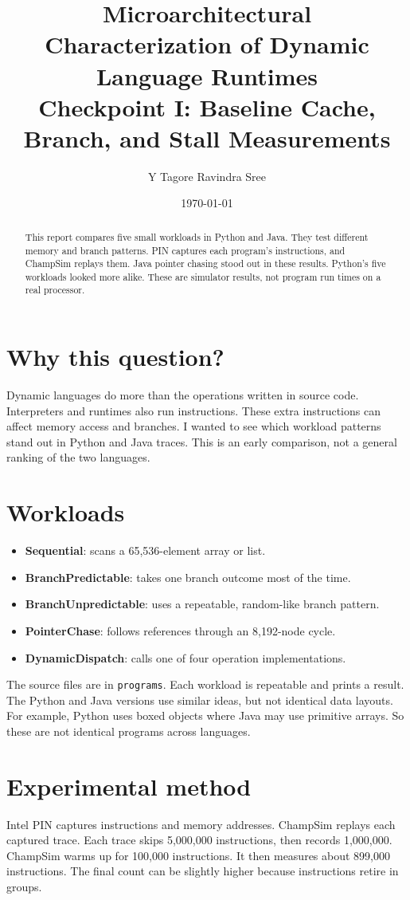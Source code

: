 \documentclass[11pt]{article}
\title{Microarchitectural Characterization of Dynamic Language Runtimes\\
\large Checkpoint I: Baseline Cache, Branch, and Stall Measurements}
\author{Y Tagore Ravindra Sree}
\date{\today}
\begin{document}
\maketitle

\begin{abstract}
This report compares five small workloads in Python and Java. They test
different memory and branch patterns. PIN captures each program's instructions,
and ChampSim replays them. Java pointer chasing stood out in these results.
Python's five workloads looked more alike. These are simulator results, not
program run times on a real processor.
\end{abstract}

\section{Why this question?}
Dynamic languages do more than the operations written in source code.
Interpreters and runtimes also run instructions. These extra instructions can
affect memory access and branches. I wanted to see which workload patterns
stand out in Python and Java traces. This is an early comparison, not a
general ranking of the two languages.

\section{Workloads}
\begin{itemize}
  \item \textbf{Sequential}: scans a 65,536-element array or list.
  \item \textbf{BranchPredictable}: takes one branch outcome most of the time.
  \item \textbf{BranchUnpredictable}: uses a repeatable, random-like branch pattern.
  \item \textbf{PointerChase}: follows references through an 8,192-node cycle.
  \item \textbf{DynamicDispatch}: calls one of four operation implementations.
\end{itemize}
The source files are in \texttt{programs}. Each workload is repeatable and
prints a result. The Python and Java versions use similar ideas, but not
identical data layouts. For example, Python uses boxed objects where Java may
use primitive arrays. So these are not identical programs across languages.

\section{Experimental method}
Intel PIN captures instructions and memory addresses. ChampSim replays each
captured trace. Each trace skips 5,000,000 instructions, then records
1,000,000. ChampSim warms up for 100,000 instructions. It then measures about
899,000 instructions. The final count can be slightly higher because
instructions retire in groups.
\end{document}
